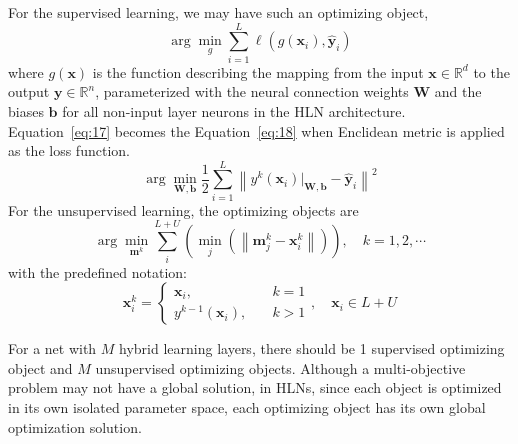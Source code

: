 \documentclass[3p,times,procedia]{elsarticle}
\begin{document}
For the supervised learning, we may 
have such an optimizing object,
\begin{equation}
	\arg \min_g \sum_{i=1}^L\ell\left(
	g(\mathbf{x}_i),
	\mathbf{\hat{y}}_i
	\right)
	\label{eq:17}
\end{equation}
where $g(\mathbf{x})$ is the
function describing
the mapping from the input 
$\mathbf{x}\in\mathbb{R}^d$ to the 
output
$\mathbf{y}\in\mathbb{R}^n$, 
parameterized with
the neural connection 
weights $\mathbf{W}$ and 
the biases $\mathbf{b}$ for all 
non-input 
layer neurons in the HLN 
architecture.
Equation~\ref{eq:17} becomes the 
Equation~\ref{eq:18} when Enclidean 
metric is applied as the loss function.
\begin{equation}
	\arg \min_{\mathbf{W},\mathbf{b}}
	\frac{1}{2}
	\sum_{i=1}^L
	\left\|
	y^k(
	\mathbf{x}_i)\big|_{\mathbf{W},\mathbf{b}}-
	\mathbf{\hat{y}}_i
	\right\|^2
	\label{eq:18}
\end{equation}
For the unsupervised learning, 
the optimizing
objects are
\begin{equation}
	\arg \min_{\mathbf{m}^k}
	\sum_i^{L+U}
	\left(
	\min_j\left(
	\left\|
	\mathbf{m}^k_j-\mathbf{x}^k_i
	\right\|
	\right)
	\right),\quad k=1,2,\cdots
	\label{eq:19}
\end{equation}
with the predefined notation:
\begin{equation}
	\mathbf{x}_i^k=
	\left\{
		\begin{aligned}
			\mathbf{x}_i,\quad & k=1\\
			y^{k-1}(\mathbf{x}_i),\quad & k>1
		\end{aligned}
	\right.
	,\quad \mathbf{x}_i\in L+U
	\label{eq:20}
\end{equation}

For a net with $M$ hybrid learning layers,
there should be 1 supervised optimizing
object
and $M$ unsupervised optimizing objects.
Although a multi-objective problem 
may not 
have a global solution, in HLNs, since
each object is optimized in its 
own isolated
parameter space, 
each optimizing object
has its own global 
optimization 
solution.
\end{document}
